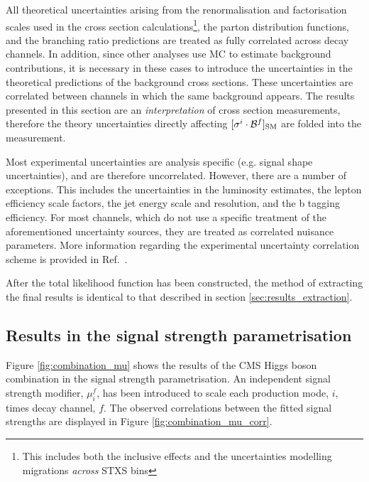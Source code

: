 All theoretical uncertainties arising from the renormalisation and factorisation scales used in the cross section calculations\footnote{This includes both the inclusive effects and the uncertainties modelling migrations \textit{across} STXS bins}, the parton distribution functions, and the branching ratio predictions are treated as fully correlated across decay channels. In addition, since other analyses use MC to estimate background contributions, it is necessary in these cases to introduce the uncertainties in the theoretical predictions of the background cross sections. These uncertainties are correlated between channels in which the same background appears. The results presented in this section are an \textit{interpretation} of cross section measurements, therefore the theory uncertainties directly affecting $[\sigma^i \cdot \mathcal{B}^{f}]_{\rm{SM}}$ are folded into the measurement.

Most experimental uncertainties are analysis specific (e.g. \mgg signal shape uncertainties), and are therefore uncorrelated. However, there are a number of exceptions. This includes the uncertainties in the luminosity estimates, the lepton efficiency scale factors, the jet energy scale and resolution, and the b tagging efficiency. For most channels, which do not use a specific treatment of the aforementioned uncertainty sources, they are treated as correlated nuisance parameters. More information regarding the experimental uncertainty correlation scheme is provided in Ref.~\cite{CMS-PAS-HIG-19-005}.

After the total likelihood function has been constructed, the method of extracting the final results is identical to that described in section \ref{sec:results_extraction}.

\subsection{Results in the signal strength parametrisation}
Figure \ref{fig:combination_mu} shows the results of the CMS Higgs boson combination in the signal strength parametrisation. An independent signal strength modifier, $\mu_i^f$, has been introduced to scale each production mode, $i$, times decay channel, $f$. The observed correlations between the fitted signal strengths are displayed in Figure \ref{fig:combination_mu_corr}.

